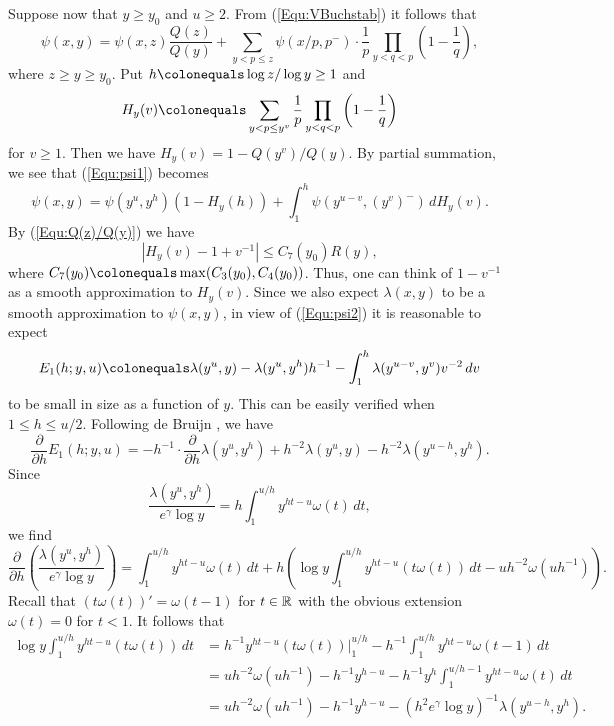 \documentclass[12pt,reqno]{amsart}
\begin{document}
\par Suppose now that $y\ge y_0$ and $u\ge2$. From (\ref{Equ:VBuchstab}) it follows that
\begin{equation}\label{Equ:psi1}
\psi(x,y)=\psi(x,z)\frac{Q(z)}{Q(y)}+\sum_{y<p\le z}\psi(x/p,p^-)\cdot\frac{1}{p}\prod_{y<q<p}\left(1-\frac{1}{q}\right),
\end{equation}
where $z\ge y\ge y_0$. Put $h\colonequals \log z/\log y\ge1$ and
\begin{equation}\label{Equ:H_y(v)}
H_y(v)\colonequals\sum_{y<p\le y^v}\frac{1}{p}\prod_{y<q<p}\left(1-\frac{1}{q}\right)
\end{equation}
for $v\ge1$. Then we have $H_y(v)=1-Q(y^v)/Q(y)$. By partial summation, we see that (\ref{Equ:psi1}) becomes
\begin{equation}\label{Equ:psi2}
\psi(x,y)=\psi(y^u,y^h)(1-H_y(h))+\int_{1}^{h}\psi(y^{u-v},(y^v)^-)\,dH_y(v).
\end{equation}
By (\ref{Equ:Q(z)/Q(y)}) we have
\[|H_y(v)-1+v^{-1}|\le C_7(y_0)R(y),\]
where $C_7(y_0)\colonequals\max(C_3(y_0),C_4(y_0))$. Thus, one can think of $1-v^{-1}$ as a smooth approximation to $H_y(v)$. Since we also expect $\lambda(x,y)$ to be a smooth approximation to $\psi(x,y)$, in view of (\ref{Equ:psi2}) it is reasonable to expect 
\[E_1(h;y,u)\colonequals\lambda(y^u,y)-\lambda(y^u,y^h)h^{-1}-\int_{1}^{h}\lambda(y^{u-v},y^v)v^{-2}\,dv\]
to be small in size as a function of $y$. This can be easily verified when $1\le h\le u/2$. Following de Bruijn \cite{Br}, we have 
\begin{equation}\label{Equ:partialE_1}
\frac{\partial}{\partial h}E_1(h;y,u)=-h^{-1}\cdot\frac{\partial}{\partial h}\lambda(y^u,y^h)+h^{-2}\lambda(y^{u},y)-h^{-2}\lambda(y^{u-h},y^h).
\end{equation}
Since 
\[\frac{\lambda(y^u,y^h)}{e^{\gamma}\log y}=h\int_{1}^{u/h}y^{ht-u}\omega(t)\,dt,\]
we find
\[\frac{\partial}{\partial h}\left(\frac{\lambda(y^u,y^h)}{e^{\gamma}\log y}\right)=\int_{1}^{u/h}y^{ht-u}\omega(t)\,dt+h\left(\log y\int_{1}^{u/h}y^{ht-u}(t\omega(t))\,dt-uh^{-2}\omega(uh^{-1})\right).\]
Recall that $(t\omega(t))'=\omega(t-1)$ for $t\in\mathbb R$ with the obvious extension $\omega(t)=0$ for $t<1$. It follows that
\begin{align*}
\log y\int_{1}^{u/h}y^{ht-u}(t\omega(t))\,dt&=h^{-1}y^{ht-u}(t\omega(t))\bigg|_{1}^{u/h}-h^{-1}\int_{1}^{u/h}y^{ht-u}\omega(t-1)\,dt\\
&=uh^{-2}\omega(uh^{-1})-h^{-1}y^{h-u}-h^{-1}y^h\int_{1}^{u/h-1}y^{ht-u}\omega(t)\,dt\\
&=uh^{-2}\omega(uh^{-1})-h^{-1}y^{h-u}-\left(h^2e^\gamma\log y\right)^{-1}\lambda(y^{u-h},y^h).
\end{align*}
\end{document}
